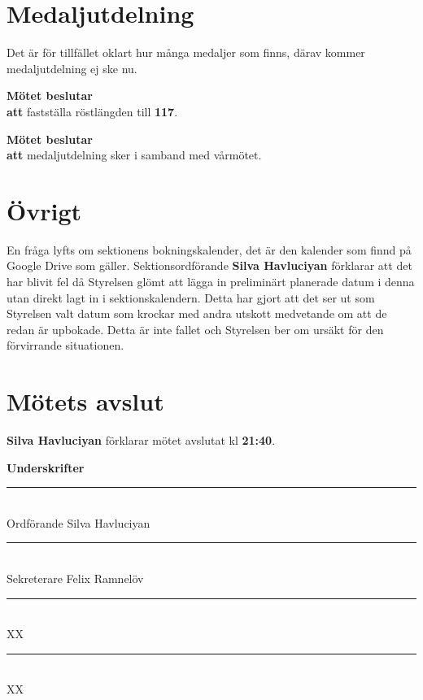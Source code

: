 \documentclass{datateknologsektionen-document}
\newcommand{\ind}{\hspace*{2em}}
\newcommand{\motetbeslutar}{\textbf{Mötet beslutar}}
\newcommand{\att}{\\\ind\textbf{att}}
\newcommand{\rostlangd}[1]{\motetbeslutar\att{} fastställa röstlängden till \textbf{#1}.}
\begin{document}
\pagebreak

\section{Medaljutdelning}

Det är för tillfället oklart hur många medaljer som finns, därav kommer medaljutdelning ej ske nu.

\rostlangd{117}

\motetbeslutar\att{} medaljutdelning sker i samband med vårmötet.

\section{Övrigt}

En fråga lyfts om sektionens bokningskalender, det är den kalender som finnd på Google Drive som gäller. Sektionsordförande \textbf{Silva Havluciyan} 
förklarar att det har blivit fel då Styrelsen glömt att lägga in preliminärt planerade datum i denna utan direkt lagt in i sektionskalendern. 
Detta har gjort att det ser ut som Styrelsen valt datum som krockar med andra utskott medvetande om att de redan är upbokade. Detta är inte 
fallet och Styrelsen ber om ursäkt för den förvirrande situationen. 

\section{Mötets avslut}


\textbf{Silva Havluciyan} förklarar mötet avslutat kl \textbf{21:40}.


\pagebreak
{\Large\bfseries Underskrifter}

\vspace*{1.2cm}
\noindent\rule{8cm}{1pt}\\
Ordförande Silva Havluciyan

\vspace*{1.2cm}
\noindent\rule{8cm}{1pt}\\
Sekreterare Felix Ramnelöv

\vspace*{1.2cm}
\noindent\rule{8cm}{1pt}\\
XX

\vspace*{1.2cm}
\noindent\rule{8cm}{1pt}\\
XX
\end{document}
